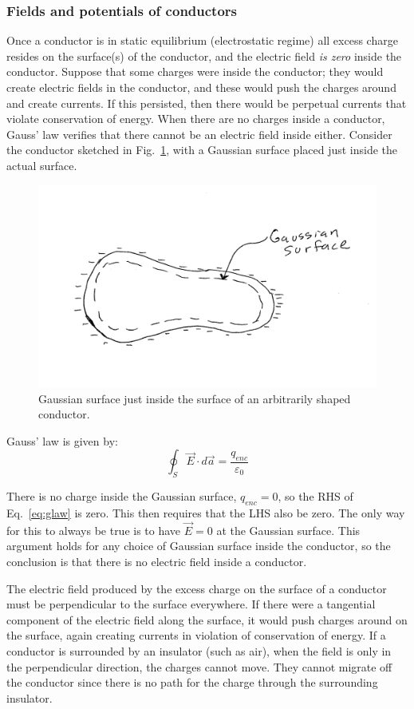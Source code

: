 \documentclass[12pt]{article}
\begin{document}
\begin{flushleft}
\subsubsection*{\bf Fields and potentials of conductors}

Once a conductor is in static equilibrium (electrostatic regime) all excess charge resides on the surface(s) of the conductor, and the electric field {\it is zero} inside the conductor.  Suppose that some charges were inside the conductor; they would create electric fields in the conductor, and these would push the charges around and create currents.  If this persisted, then there would be perpetual currents that violate conservation of energy.  When there are no charges inside a conductor, Gauss' law verifies that there cannot be an electric field inside either.  Consider the conductor sketched in Fig.~\ref{fig:empty}, with a Gaussian surface placed just inside the actual surface.

\begin{figure}[h]
\centering
\includegraphics*[trim=0cm 1cm 0cm 1cm, clip=true, width=0.6\columnwidth]{gsurface.png}
\caption{\small Gaussian surface just inside the surface of an arbitrarily shaped conductor.}
\label{fig:empty}
\end{figure}

Gauss' law is given by:
\begin{equation}
\oint_{S} \vec{E} \cdot d\vec{a} = \frac{q_{enc}}{\varepsilon_{0}} 
\label{eq:glaw}
\end{equation}

There is no charge inside the Gaussian surface, $q_{enc}=0$, so the RHS of Eq.~\ref{eq:glaw} is zero.  This then requires that the LHS also be zero.  The only way for this to always be true is to have $\vec{E}=0$ at the Gaussian surface.  This argument holds for any choice of Gaussian surface inside the conductor, so the conclusion is that there is no electric field inside a conductor. 

The electric field produced by the excess charge on the surface of a conductor must be perpendicular to the surface everywhere.  If there were a tangential component of the electric field along the surface, it would push charges around on the surface, again creating currents in violation of conservation of energy.  If a conductor is surrounded by an insulator (such as air), when the field is only in the perpendicular direction, the charges cannot move.  They cannot migrate off the conductor since there is no path for the charge through the surrounding insulator.


\end{flushleft}
\end{document}
